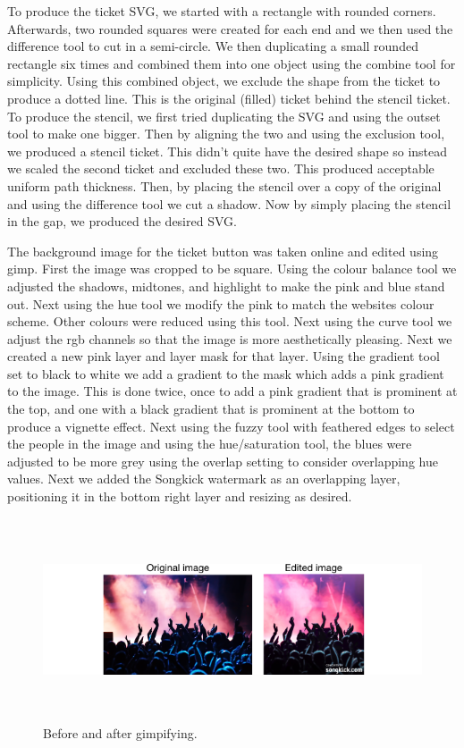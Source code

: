 \documentclass[10pt]{article}
\begin{document}
                To produce the ticket SVG, we started with a rectangle with rounded corners. Afterwards, two rounded squares were created for each end and we then used the difference tool to cut in a semi-circle. We then duplicating a small rounded rectangle six times and combined them into one object using the combine tool for simplicity. Using this combined object, we exclude the shape from the ticket to produce a dotted line. This is the original (filled) ticket behind the stencil ticket. To produce the stencil, we first tried duplicating the SVG and using the outset tool to make one bigger. Then by aligning the two and using the exclusion tool, we produced a stencil ticket. This didn't quite have the desired shape so instead we scaled the second ticket and excluded these two. This produced acceptable uniform path thickness. Then, by placing the stencil over a copy of the original and using the difference tool we cut a shadow. Now by simply placing the stencil in the gap, we produced the desired SVG. 

                The background image for the ticket button was taken online and edited using gimp. First the image was cropped to be square. Using the colour balance tool we adjusted the shadows, midtones, and highlight to make the pink and blue stand out. Next using the hue tool we modify the pink to match the websites colour scheme. Other colours were reduced using this tool. Next using the curve tool we adjust the rgb channels so that the image is more aesthetically pleasing. Next we created a new pink layer and layer mask for that layer. Using the gradient tool set to black to white we add a gradient to the mask which adds a pink gradient to the image. This is done twice, once to add a pink gradient that is prominent at the top, and one with a black gradient that is prominent at the bottom to produce a vignette effect. Next using the fuzzy tool with feathered edges to select the people in the image and using the hue/saturation tool, the blues were adjusted to be more grey using the overlap setting to consider overlapping hue values. Next we added the Songkick watermark as an overlapping layer, positioning it in the bottom right layer and resizing as desired.

                \begin{figure}[!ht]
                  \centering
                      \includegraphics[height=60mm]{example2.png}
                  \caption{Before and after gimpifying.}
                \end{figure}
\end{document}

